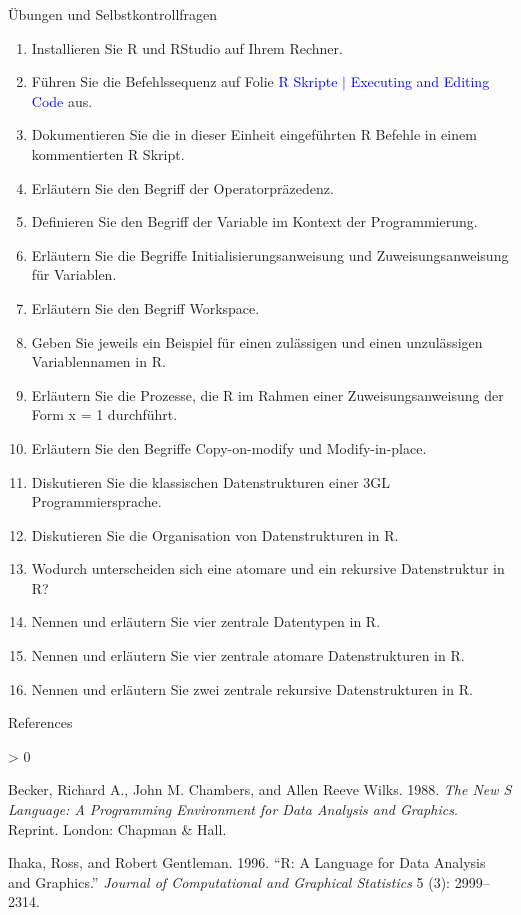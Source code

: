 \documentclass[
  8pt,
  ignorenonframetext,
]{beamer}
\providecommand{\tightlist}{%
  \setlength{\itemsep}{0pt}\setlength{\parskip}{0pt}}
\newlength{\cslhangindent}
\newenvironment{CSLReferences}[2] %
 {%
  \setlength{\parindent}{0pt}
  \ifodd #1 \everypar{\setlength{\hangindent}{\cslhangindent}}\ignorespaces\fi
  \ifnum #2 > 0
  \setlength{\parskip}{#2\baselineskip}
  \fi
 }%
 {}
\begin{document}
\begin{frame}{Übungen und Selbstkontrollfragen}
\protect\hypertarget{uxfcbungen-und-selbstkontrollfragen}{}
\footnotesize

\begin{enumerate}
\tightlist
\item
  Installieren Sie R und RStudio auf Ihrem Rechner.
\item
  Führen Sie die Befehlssequenz auf Folie
  \textcolor{blue}{R Skripte $\vert$ Executing and Editing Code} aus.
\item
  Dokumentieren Sie die in dieser Einheit eingeführten R Befehle in
  einem kommentierten R Skript.
\item
  Erläutern Sie den Begriff der Operatorpräzedenz.
\item
  Definieren Sie den Begriff der Variable im Kontext der Programmierung.
\item
  Erläutern Sie die Begriffe Initialisierungsanweisung und
  Zuweisungsanweisung für Variablen.
\item
  Erläutern Sie den Begriff Workspace.
\item
  Geben Sie jeweils ein Beispiel für einen zulässigen und einen
  unzulässigen Variablennamen in R.
\item
  Erläutern Sie die Prozesse, die R im Rahmen einer Zuweisungsanweisung
  der Form x = 1 durchführt.
\item
  Erläutern Sie den Begriffe Copy-on-modify und Modify-in-place.
\item
  Diskutieren Sie die klassischen Datenstrukturen einer 3GL
  Programmiersprache.
\item
  Diskutieren Sie die Organisation von Datenstrukturen in R.
\item
  Wodurch unterscheiden sich eine atomare und ein rekursive
  Datenstruktur in R?
\item
  Nennen und erläutern Sie vier zentrale Datentypen in R.
\item
  Nennen und erläutern Sie vier zentrale atomare Datenstrukturen in R.
\item
  Nennen und erläutern Sie zwei zentrale rekursive Datenstrukturen in R.
\end{enumerate}
\end{frame}

\begin{frame}{References}
\protect\hypertarget{references}{}
\footnotesize

\hypertarget{refs}{}
\begin{CSLReferences}{1}{0}
\leavevmode\hypertarget{ref-becker_new_1988}{}%
Becker, Richard A., John M. Chambers, and Allen Reeve Wilks. 1988.
\emph{The New {S} Language: A Programming Environment for Data Analysis
and Graphics}. Reprint. {London}: {Chapman \& Hall}.

\leavevmode\hypertarget{ref-ihaka_language_1996}{}%
Ihaka, Ross, and Robert Gentleman. 1996. {``R: {A Language} for {Data
Analysis} and {Graphics}.''} \emph{Journal of Computational and
Graphical Statistics} 5 (3): 2999--2314.

\end{CSLReferences}
\end{frame}
\end{document}
